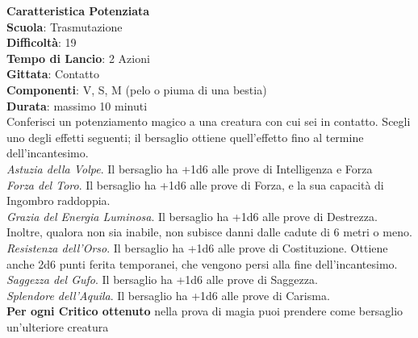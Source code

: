 \begin{multicols}{2}
\medskip\textbf{Caratteristica Potenziata}\\
\textbf{Scuola}: Trasmutazione\\
\textbf{Difficoltà}: 19\\
\textbf{Tempo di Lancio}: 2 Azioni\\
\textbf{Gittata}: Contatto\\
\textbf{Componenti}: V, S, M (pelo o piuma di una bestia)\\
\textbf{Durata}: massimo 10 minuti\\
Conferisci un potenziamento magico a una creatura con cui sei in contatto. Scegli uno degli effetti seguenti; il bersaglio ottiene quell'effetto fino al termine dell'incantesimo.\\
\textit{Astuzia della Volpe}. Il bersaglio ha +1d6 alle prove di Intelligenza e Forza\\
\textit{Forza del Toro}. Il bersaglio ha +1d6 alle prove di Forza, e la sua capacità di Ingombro raddoppia.\\
\textit{Grazia del Energia Luminosa}. Il bersaglio ha +1d6 alle prove di Destrezza. Inoltre, qualora non sia inabile, non subisce danni dalle cadute di 6 metri o meno.\\
\textit{Resistenza dell'Orso}. Il bersaglio ha +1d6 alle prove di Costituzione. Ottiene anche 2d6 punti ferita temporanei, che vengono persi alla fine dell'incantesimo.\\
\textit{Saggezza del Gufo}. Il bersaglio ha +1d6 alle prove di Saggezza. \\
\textit{Splendore dell'Aquila}. Il bersaglio ha +1d6 alle prove di Carisma.\\
\textbf{Per ogni Critico ottenuto} nella prova di magia puoi prendere come bersaglio un'ulteriore creatura


\end{multicols}
